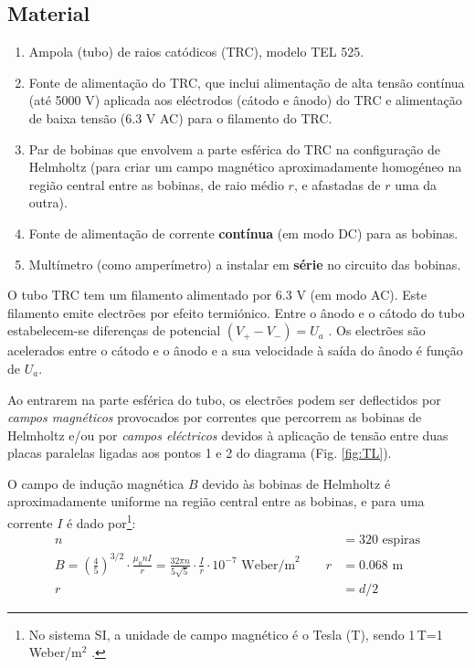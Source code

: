 \documentclass[a4paper,twoside,11pt]{report}      %
\begin{document}
\subsection {\sf Material}
\begin{enumerate}
	\item Ampola (tubo) de raios catódicos (TRC), modelo TEL 525.
	\item 	Fonte de alimentação do TRC, que inclui alimentação de alta tensão contínua 
	(até 5000 V) aplicada aos eléctrodos (cátodo e ânodo) do TRC e alimentação de baixa tensão
	(6.3 V AC) para o filamento do TRC.
	\item Par de bobinas que envolvem a parte esférica do TRC na configuração de
	Helmholtz (para criar um campo magnético aproximadamente homogéneo na
	região central entre as bobinas, de raio médio $r$, e afastadas de $r$ uma da outra).
	\item Fonte de alimentação de corrente \textbf{contínua} (em modo DC) para as bobinas.
	\item Multímetro (como amperímetro) a instalar em \textbf{série} no circuito das bobinas.
\end{enumerate}

O tubo TRC tem um filamento alimentado por 6.3 V (em modo AC). Este filamento emite electrões por efeito termiónico. 
Entre o ânodo e o cátodo do tubo estabelecem-se diferenças de potencial $ (V_+ - V_-) = U_a$ . Os electrões são acelerados entre o cátodo e o ânodo e a sua velocidade à saída do ânodo é função de $U_a$. 

Ao entrarem na parte esférica do tubo, os electrões podem ser deflectidos por \emph{campos magnéticos} provocados por correntes que percorrem as bobinas de Helmholtz e/ou por \emph{campos eléctricos} devidos à aplicação de tensão entre duas placas paralelas ligadas aos pontos 1 e 2 do diagrama (Fig. \ref{fig:TL}).

O campo de indução magnética $B$ devido às bobinas de Helmholtz é aproximadamente uniforme na região central entre as bobinas, e para uma corrente $I$ é dado por\footnote{No sistema SI, a unidade de campo magnético é o Tesla (T), sendo 1\,T=1\,Weber/m$^{2}$ .}:
\begin{align}
	\label{eq:helmotz}
	 n &= 320\textrm{ espiras} \nonumber \\ 
B = \left(\frac{4}{5}\right)^{3/2} \cdot \frac{\mu_0 n I}{r} =  \frac{32 \pi n }{5 \sqrt{5}} \cdot \frac{I}{r} \cdot 10^{-7}\textrm{ Weber/m}^{2}
 \qquad  r  &= 0.068\textrm{ m} \\
r  &= d/2 \nonumber
\end{align}
\end{document}
